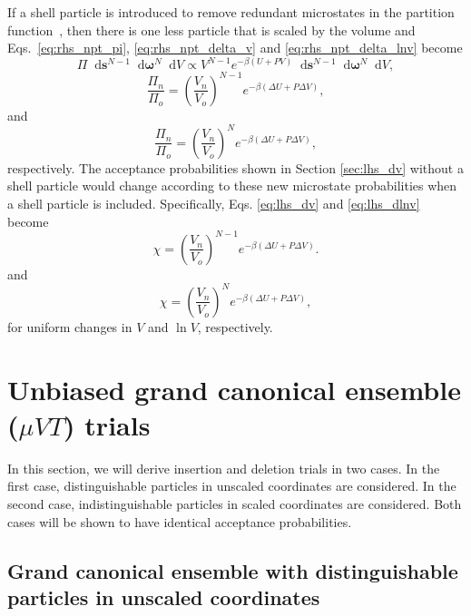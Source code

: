 \documentclass[
  9pt,
  bestpractices,
]{livecoms}
\newcommand*\diff{\mathop{}\!\mathrm{d}}
\begin{document}
If a shell particle is introduced to remove redundant microstates in the partition function~\cite{attard_density_1995, koper_length_1996, corti_deriving_1998, han_isothermal-isobaric_2001, corti_isothermal-isobaric_2001, corti_monte_2002, stroker_systematic_2021, hatch_theory_2024}, then there is one less particle that is scaled by the volume and Eqs.~\ref{eq:rhs_npt_pi}, \ref{eq:rhs_npt_delta_v} and \ref{eq:rhs_npt_delta_lnv} become 
\begin{equation}
\Pi \diff\mathbf{s}^{N-1}\diff\boldsymbol{\omega}^{N}\diff V \propto V^{N-1} e^{-\beta(U+P V)} \diff\mathbf{s}^{N-1} \diff\boldsymbol{\omega}^{N}\diff V,
\end{equation}
\begin{equation}
\frac{\Pi_n}{\Pi_o} = \left(\frac{V_n}{V_o}\right)^{N-1}e^{-\beta(\Delta U + P\Delta V)},
\end{equation}
and
\begin{equation}
\frac{\Pi_n}{\Pi_o} = \left(\frac{V_n}{V_o}\right)^{N}e^{-\beta(\Delta U + P\Delta V)},
\end{equation}
respectively.
The acceptance probabilities shown in Section \ref{sec:lhs_dv} without a shell particle would change according to these new microstate probabilities when a shell particle is included.
Specifically, Eqs. \ref{eq:lhs_dv} and \ref{eq:lhs_dlnv} become
\begin{equation}
\chi=\left(\frac{V_n}{V_o}\right)^{N-1}e^{-\beta(\Delta U + P\Delta V)}.
\end{equation}
and
\begin{equation}
\chi=\left(\frac{V_n}{V_o}\right)^{N}e^{-\beta(\Delta U + P\Delta V)},
\end{equation}
for uniform changes in $V$ and $\ln V$, respectively.

\section{\label{sec:rhs_muvt}Unbiased grand canonical ensemble ($\mu VT$) trials}

In this section, we will derive insertion and deletion trials in two cases.
In the first case, distinguishable particles in unscaled coordinates are considered.
In the second case, indistinguishable particles in scaled coordinates are considered.
Both cases will be shown to have identical acceptance probabilities.

\subsection{\label{sec:rhs_muvt_distinguishable}Grand canonical ensemble with distinguishable particles in unscaled coordinates}
\end{document}
